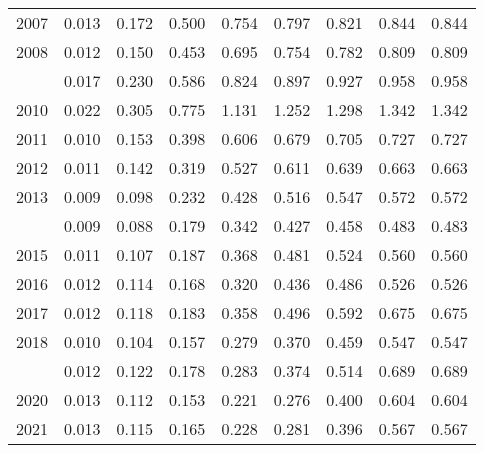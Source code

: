 \documentclass[
]{article}
\begin{document}
\begin{longtable}[t]{lrrrrrrrr}
2007 & 0.013 & 0.172 & 0.500 & 0.754 & 0.797 & 0.821 & 0.844 & 0.844\\
2008 & 0.012 & 0.150 & 0.453 & 0.695 & 0.754 & 0.782 & 0.809 & 0.809\\
\addlinespace
2009 & 0.017 & 0.230 & 0.586 & 0.824 & 0.897 & 0.927 & 0.958 & 0.958\\
2010 & 0.022 & 0.305 & 0.775 & 1.131 & 1.252 & 1.298 & 1.342 & 1.342\\
2011 & 0.010 & 0.153 & 0.398 & 0.606 & 0.679 & 0.705 & 0.727 & 0.727\\
2012 & 0.011 & 0.142 & 0.319 & 0.527 & 0.611 & 0.639 & 0.663 & 0.663\\
2013 & 0.009 & 0.098 & 0.232 & 0.428 & 0.516 & 0.547 & 0.572 & 0.572\\
\addlinespace
2014 & 0.009 & 0.088 & 0.179 & 0.342 & 0.427 & 0.458 & 0.483 & 0.483\\
2015 & 0.011 & 0.107 & 0.187 & 0.368 & 0.481 & 0.524 & 0.560 & 0.560\\
2016 & 0.012 & 0.114 & 0.168 & 0.320 & 0.436 & 0.486 & 0.526 & 0.526\\
2017 & 0.012 & 0.118 & 0.183 & 0.358 & 0.496 & 0.592 & 0.675 & 0.675\\
2018 & 0.010 & 0.104 & 0.157 & 0.279 & 0.370 & 0.459 & 0.547 & 0.547\\
\addlinespace
2019 & 0.012 & 0.122 & 0.178 & 0.283 & 0.374 & 0.514 & 0.689 & 0.689\\
2020 & 0.013 & 0.112 & 0.153 & 0.221 & 0.276 & 0.400 & 0.604 & 0.604\\
2021 & 0.013 & 0.115 & 0.165 & 0.228 & 0.281 & 0.396 & 0.567 & 0.567\\*
\end{longtable}
\end{document}
